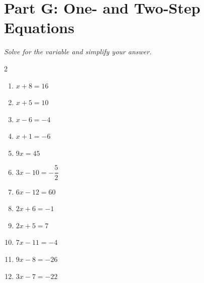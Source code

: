 \documentclass[11pt]{article}
\begin{document}
\section*{Part G: One- and Two-Step Equations}
\noindent\textit{Solve for the variable and simplify your answer.}
\begin{multicols}{2}
\begin{enumerate}
  \item $x + 8 = 16$
  \vspace{1.6cm}
  \item $x + 5 = 10$
  \vspace{1.6cm}
  \item $x - 6 = -4$
  \vspace{1.6cm}
  \item $x + 1 = -6$
  \vspace{1.6cm}
  \item $9x = 45$
  \vspace{1.6cm}
  \item $3x - 10 = -\dfrac{5}{2}$
  \vspace{1.6cm}
  \item $6x - 12 = 60$
  \vspace{1.6cm}
  \item $2x + 6 = -1$
  \vspace{1.6cm}
  \item $2x + 5 = 7$
  \vspace{1.6cm}
  \item $7x - 11 = -4$
  \vspace{1.6cm}
  \item $9x - 8 = -26$
  \vspace{1.6cm}
  \item $3x - 7 = -22$
  \vspace{1.6cm}
\end{enumerate}
\end{multicols}
\end{document}
